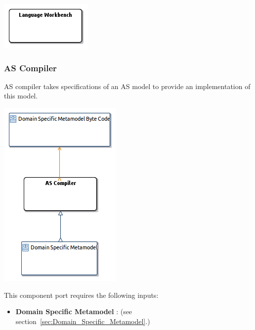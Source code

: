 \documentclass{gemoc} %
\begin{document}
\begin{center}
\includegraphics*[trim=0.0cm 0.0cm 0cm 0.0cm, clip=true]{../images/generated/Generated_Language_Workbench.png}
\end{center}



\subsubsection{AS Compiler}
\label{sec:AS_Compiler}
AS compiler takes specifications of an AS model to provide an implementation of this model.
\begin{center}
\includegraphics*[trim=0.0cm 0.0cm 0cm 0.0cm, clip=true]{../images/generated/Generated_AS_Compiler.png}
\end{center}

This component port requires the following inputs:
\begin{itemize}
  \item \textbf{Domain Specific Metamodel} :
(see section~\ref{sec:Domain_Specific_Metamodel}.)
\end{itemize}
\end{document}
